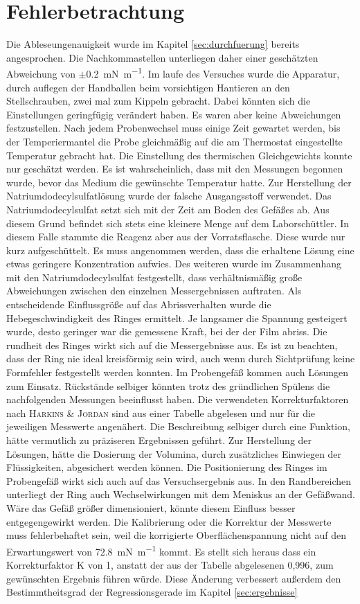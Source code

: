 \section{Fehlerbetrachtung}
\label{sec:fehler}
Die Ableseungenauigkeit wurde im Kapitel \ref{sec:durchfuerung} bereits angesprochen. Die Nachkommastellen unterliegen daher einer geschätzten Abweichung von $\pm$\SI{0,2}{\milli\newton\per\meter}. Im laufe des Versuches wurde die Apparatur, durch auflegen der Handballen beim vorsichtigen Hantieren an den Stellschrauben, zwei  mal zum Kippeln gebracht. Dabei könnten sich die Einstellungen geringfügig verändert haben. Es waren aber keine Abweichungen festzustellen. Nach jedem Probenwechsel muss einige Zeit gewartet werden, bis der Temperiermantel die Probe gleichmäßig auf die am Thermostat eingestellte Temperatur gebracht hat. Die Einstellung des thermischen Gleichgewichts konnte nur geschätzt werden. Es ist wahrscheinlich, dass mit den Messungen begonnen wurde, bevor das Medium die gewünschte Temperatur hatte. Zur Herstellung der Natriumdodecylsulfatlösung wurde der falsche Ausgangsstoff verwendet. Das Natriumdodecylsulfat setzt sich mit der Zeit am Boden des Gefäßes ab. Aus diesem Grund befindet sich stets eine kleinere Menge auf dem Laborschüttler. In diesem Falle stammte die Reagenz aber aus der Vorratsflasche. Diese wurde nur kurz aufgeschüttelt. Es muss angenommen werden, dass die erhaltene Lösung eine etwas geringere Konzentration aufwies. Des weiteren wurde im Zusammenhang mit den Natriumdodecylsulfat festgestellt, dass verhältnismäßig große Abweichungen zwischen den einzelnen Messergebnissen auftraten. Als entscheidende Einflussgröße auf das Abrissverhalten wurde die Hebegeschwindigkeit des Ringes ermittelt. Je langsamer die Spannung gesteigert wurde, desto geringer war die gemessene Kraft, bei der der Film abriss. Die rundheit des Ringes wirkt sich auf die Messergebnisse aus. Es ist zu beachten, dass der Ring nie ideal kreisförmig sein wird, auch wenn durch Sichtprüfung keine Formfehler festgestellt werden konnten. Im Probengefäß kommen auch Lösungen zum Einsatz. Rückstände selbiger könnten trotz des gründlichen Spülens die nachfolgenden Messungen beeinflusst haben. Die verwendeten Korrekturfaktoren nach \textsc{Harkins \& Jordan} sind aus einer Tabelle abgelesen und nur für die jeweiligen Messwerte angenähert. Die Beschreibung selbiger durch eine Funktion, hätte vermutlich zu präziseren Ergebnissen geführt. Zur Herstellung der Lösungen, hätte die Dosierung der Volumina, durch zusätzliches Einwiegen der Flüssigkeiten, abgesichert werden können. Die Positionierung des Ringes im Probengefäß wirkt sich auch auf das Versuchsergebnis aus. In den Randbereichen unterliegt der Ring auch Wechselwirkungen mit dem Meniskus an der Gefäßwand. Wäre das Gefäß größer dimensioniert, könnte diesem Einfluss besser entgegengewirkt werden.
Die Kalibrierung oder die Korrektur der Messwerte muss fehlerbehaftet sein, weil die korrigierte Oberflächenspannung nicht auf den Erwartungswert von \SI{72,8}{\milli\newton\per\meter} kommt. Es stellt sich heraus dass ein Korrekturfaktor K von 1, anstatt der aus der Tabelle abgelesenen 0,996, zum gewünschten Ergebnis führen würde. Diese Änderung verbessert außerdem den Bestimmtheitsgrad der Regressionsgerade im Kapitel \ref{sec:ergebnisse} 
